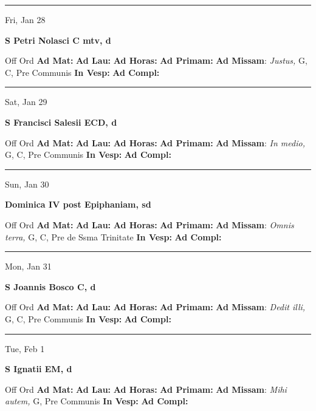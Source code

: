 \documentclass[letterpaper, 10pt]{article}
\begin{document}
\hrule
\begin{center}
Fri, Jan 28
\end{center}\textbf{ \large S Petri Nolasci C mtv, \textnormal{\normalsize d}}
\begin{justify}
Off Ord
\textbf{Ad Mat: }
\textbf{Ad Lau: }
\textbf{Ad Horas: }
\textbf{Ad Primam: }
\textbf{Ad Missam}: \textit{Justus,} G, C, Pre Communis
\textbf{In Vesp: }
\textbf{Ad Compl: }\end{justify}



\hrule
\begin{center}
Sat, Jan 29
\end{center}\textbf{ \large S Francisci Salesii ECD, \textnormal{\normalsize d}}
\begin{justify}
Off Ord
\textbf{Ad Mat: }
\textbf{Ad Lau: }
\textbf{Ad Horas: }
\textbf{Ad Primam: }
\textbf{Ad Missam}: \textit{In medio,} G, C, Pre Communis
\textbf{In Vesp: }
\textbf{Ad Compl: }\end{justify}



\hrule
\begin{center}
Sun, Jan 30
\end{center}\textbf{ \large Dominica IV post Epiphaniam, \textnormal{\normalsize sd}}
\begin{justify}
Off Ord
\textbf{Ad Mat: }
\textbf{Ad Lau: }
\textbf{Ad Horas: }
\textbf{Ad Primam: }
\textbf{Ad Missam}: \textit{Omnis terra,} G, C, Pre de Ssma Trinitate
\textbf{In Vesp: }
\textbf{Ad Compl: }\end{justify}



\hrule
\begin{center}
Mon, Jan 31
\end{center}\textbf{ \large S Joannis Bosco C, \textnormal{\normalsize d}}
\begin{justify}
Off Ord
\textbf{Ad Mat: }
\textbf{Ad Lau: }
\textbf{Ad Horas: }
\textbf{Ad Primam: }
\textbf{Ad Missam}: \textit{Dedit illi,} G, C, Pre Communis
\textbf{In Vesp: }
\textbf{Ad Compl: }\end{justify}



\hrule
\begin{center}
Tue, Feb 1
\end{center}\textbf{ \large S Ignatii EM, \textnormal{\normalsize d}}
\begin{justify}
Off Ord
\textbf{Ad Mat: }
\textbf{Ad Lau: }
\textbf{Ad Horas: }
\textbf{Ad Primam: }
\textbf{Ad Missam}: \textit{Mihi autem,} G, Pre Communis
\textbf{In Vesp: }
\textbf{Ad Compl: }\end{justify}
\end{document}
